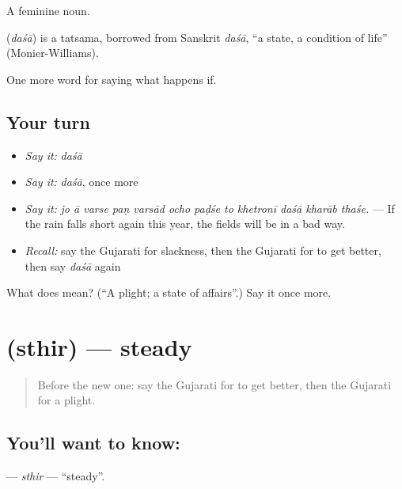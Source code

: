 A feminine noun.

\begin{cousinweb}
\textbf{} (\emph{daśā}) is a tatsama, borrowed from Sanskrit \emph{daśā}, \textquotedblleft{}a state, a condition of life\textquotedblright{} (Monier-Williams).
\end{cousinweb}

\begin{grammarlens}[title={What you've built}]
One more word for saying what happens if.
\end{grammarlens}

\subsection*{Your turn}
\begin{itemize}
\raggedright
  \item \emph{Say it:} \emph{daśā}
  \item \emph{Say it:} \emph{daśā}, once more
  \item \emph{Say it:} \emph{jo ā varse paṇ varsād ocho paḍśe to khetronī daśā kharāb thaśe.} — If the rain falls short again this year, the fields will be in a bad way.
  \item \emph{Recall:} say the Gujarati for slackness, then the Gujarati for to get better, then say \emph{daśā} again
\end{itemize}

\begin{tcolorbox}[breakable,colback=teal!4,colframe=teal!35!black,title={Before you move on}]
What does  mean? (\textquotedblleft{}A plight; a state of affairs\textquotedblright{}.) Say it once more.
\end{tcolorbox}
\section[\texorpdfstring{\gu{સ્થિર} (sthir)}{સ્થિર (sthir)}]{ (sthir) — steady}

\label{lesson:GU-C377-sthir}



\begin{quote}
Before the new one: say the Gujarati for to get better, then the Gujarati for a plight.
\end{quote}

\subsection*{You'll want to know: }
\textbf{} — \emph{sthir} — \textquotedblleft{}steady\textquotedblright{}.

